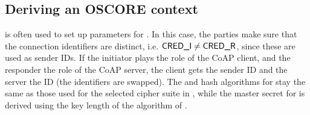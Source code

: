 %
%


\subsection{Deriving an OSCORE context}
\mEdhoc{} is often used to set up parameters for \mOscore. In this case, the
parties make sure that the connection identifiers are distinct, i.e. $\text{\textup{\textsf{CRED\_I}}}
\neq \text{\textup{\textsf{CRED\_R}}}$, since these are used as \mOscore{} sender IDs. If the initiator
plays the role of the CoAP client, and the responder the role of the CoAP
server, the client gets the sender ID \mCredr{} and the server the ID \mCredi{} (the identifiers are swapped). The \mAead{} and hash algorithms for \mOscore{} stay the same as those used for the selected cipher suite in \mEdhoc, while the master secret for \mOscore{} is derived using the key length of the \mAead{} algorithm of \mEdhoc. 

